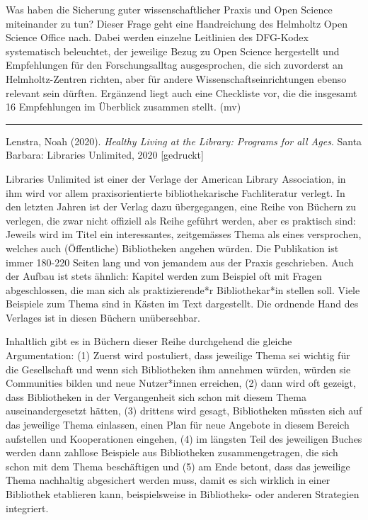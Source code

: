 \documentclass[a4paper,
fontsize=11pt,
oneside,
numbers=noperiodatend,
parskip=half-,
bibliography=totoc,
final
]{scrartcl}
\begin{document}
Was haben die Sicherung guter wissenschaftlicher Praxis und Open Science
miteinander zu tun? Dieser Frage geht eine Handreichung des Helmholtz
Open Science Office nach. Dabei werden einzelne Leitlinien des DFG-Kodex
systematisch beleuchtet, der jeweilige Bezug zu Open Science hergestellt
und Empfehlungen für den Forschungsalltag ausgesprochen, die sich
zuvorderst an Helmholtz-Zentren richten, aber für andere
Wissenschaftseinrichtungen ebenso relevant sein dürften. Ergänzend liegt
auch eine Checkliste vor, die die insgesamt 16 Empfehlungen im Überblick
zusammen stellt. (mv)

\begin{center}\rule{0.5\linewidth}{0.5pt}\end{center}

Lenstra, Noah (2020). \emph{Healthy Living at the Library: Programs for
all Ages}. Santa Barbara: Libraries Unlimited, 2020 {[}gedruckt{]}

Libraries Unlimited ist einer der Verlage der American Library
Association, in ihm wird vor allem praxisorientierte bibliothekarische
Fachliteratur verlegt. In den letzten Jahren ist der Verlag dazu
übergegangen, eine Reihe von Büchern zu verlegen, die zwar nicht
offiziell als Reihe geführt werden, aber es praktisch sind: Jeweils wird
im Titel ein interessantes, zeitgemässes Thema als eines versprochen,
welches auch (Öffentliche) Bibliotheken angehen würden. Die Publikation
ist immer 180-220 Seiten lang und von jemandem aus der Praxis
geschrieben. Auch der Aufbau ist stets ähnlich: Kapitel werden zum
Beispiel oft mit Fragen abgeschlossen, die man sich als praktizierende*r
Bibliothekar*in stellen soll. Viele Beispiele zum Thema sind in Kästen
im Text dargestellt. Die ordnende Hand des Verlages ist in diesen
Büchern unübersehbar.

Inhaltlich gibt es in Büchern dieser Reihe durchgehend die gleiche
Argumentation: (1) Zuerst wird postuliert, dass jeweilige Thema sei
wichtig für die Gesellschaft und wenn sich Bibliotheken ihm annehmen
würden, würden sie Communities bilden und neue Nutzer*innen erreichen,
(2) dann wird oft gezeigt, dass Bibliotheken in der Vergangenheit sich
schon mit diesem Thema auseinandergesetzt hätten, (3) drittens wird
gesagt, Bibliotheken müssten sich auf das jeweilige Thema einlassen,
einen Plan für neue Angebote in diesem Bereich aufstellen und
Kooperationen eingehen, (4) im längsten Teil des jeweiligen Buches
werden dann zahllose Beispiele aus Bibliotheken zusammengetragen, die
sich schon mit dem Thema beschäftigen und (5) am Ende betont, dass das
jeweilige Thema nachhaltig abgesichert werden muss, damit es sich
wirklich in einer Bibliothek etablieren kann, beispielsweise in
Bibliotheks- oder anderen Strategien integriert.
\end{document}
